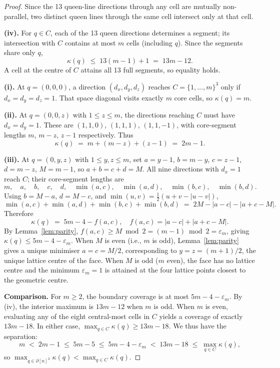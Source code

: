 \documentclass[10pt,a4paper]{amsart}
\begin{document}
\begin{proof}
Since the 13 queen-line directions through any cell are mutually non-parallel,
two distinct queen lines through the same cell intersect only at that cell.

\smallskip\noindent\textbf{(iv).}
For $q \in C$, each of the 13 queen directions determines a segment; its
intersection with $C$ contains at most $m$ cells (including $q$). Since the
segments share only $q$,
\[
  \kappa(q) \;\leq\; 13(m-1)+1 \;=\; 13m-12.
\]
A cell at the centre of $C$ attains all 13 full segments, so equality holds.

\smallskip\noindent\textbf{(i).}
At $q = (0,0,0)$, a direction $(d_x,d_y,d_z)$ reaches $C = \{1,\ldots,m\}^3$
only if $d_x = d_y = d_z = 1$. That space diagonal visits exactly $m$ core
cells, so $\kappa(q) = m$.

\smallskip\noindent\textbf{(ii).}
At $q = (0,0,z)$ with $1 \leq z \leq m$, the directions reaching $C$ must have
$d_x = d_y = 1$. These are $(1,1,0)$, $(1,1,1)$, $(1,1,-1)$, with
core-segment lengths $m$, $m-z$, $z-1$ respectively. Thus
\[
  \kappa(q) \;=\; m + (m-z) + (z-1) \;=\; 2m-1.
\]

\smallskip\noindent\textbf{(iii).}
At $q = (0,y,z)$ with  $1 \leq y,z \leq m$, set $a = y-1$, $b = m-y$,
$c = z-1$, $d = m-z$, $M = m-1$, so $a+b = c+d = M$. All nine directions with
$d_x = 1$ reach $C$; their core-segment lengths are
\[
  m,\quad a,\quad b,\quad c,\quad d,\quad
  \min(a,c),\quad \min(a,d),\quad \min(b,c),\quad \min(b,d).
\]
Using $b = M-a$, $d = M-c$, and $\min(u,v) = \tfrac{1}{2}(u+v-|u-v|)$,
\[
  \min(a,c)+\min(a,d)+\min(b,c)+\min(b,d) \;=\; 2M - |a-c| - |a+c-M|.
\]
Therefore
\[
  \kappa(q) \;=\; 5m-4 - f(a,c), \quad f(a,c) = |a-c|+|a+c-M|.
\]
By Lemma~\ref{lem:parity}, $f(a,c) \geq M \bmod 2 = (m-1) \bmod 2 =
\varepsilon_m$, giving $\kappa(q) \leq 5m-4-\varepsilon_m$. When $M$ is even
(i.e., $m$ is odd), Lemma~\ref{lem:parity} gives a unique minimiser $a = c =
M/2$, corresponding to $y = z = (m+1)/2$, the unique lattice centre of the
face. When $M$ is odd ($m$ even), the face has no lattice centre and the
minimum $\varepsilon_m = 1$ is attained at the four lattice points closest to
the geometric centre.

\smallskip\noindent\textbf{Comparison.}
For $m \geq 2$, the boundary coverage is at most $5m - 4 - \varepsilon_m$. By (iv), the interior maximum is $13m - 12$ when $m$ is odd. When $m$ is even, evaluating any of the eight central-most cells in $C$ yields a coverage of exactly $13m - 18$. In either case, $\max_{q\in C}\kappa(q) \geq 13m - 18$. We thus have the separation:
\[
  m \;<\; 2m-1 \;\leq\; 5m-5 \;\leq\; 5m-4-\varepsilon_m \;<\; 13m-18 \;\leq\; \max_{q\in C}\kappa(q),
\]
so $\max_{q\in\partial[n]^3}\kappa(q) < \max_{q\in C}\kappa(q)$.
\end{proof}
\end{document}
